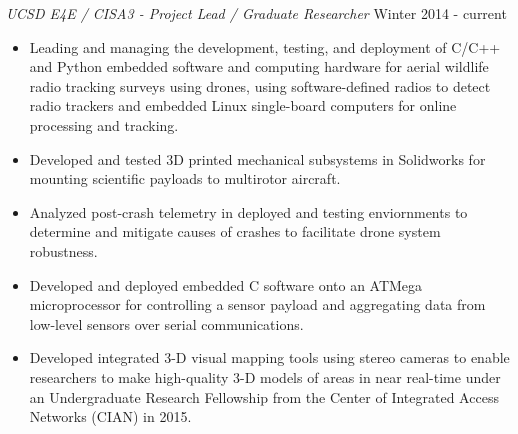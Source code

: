 \documentclass[line,margin]{res}
\begin{document}
\begin{resume}
	{\sl UCSD E4E / CISA3 - Project Lead / Graduate Researcher} \hfill Winter 2014 - current
	\begin{itemize}
		\item Leading and managing the development, testing, and deployment of C/C++ and Python embedded software and computing hardware for aerial wildlife radio tracking surveys using drones, using software-defined radios to detect radio trackers and embedded Linux single-board computers for online processing and tracking.
		\item Developed and tested 3D printed mechanical subsystems in Solidworks for mounting scientific payloads to multirotor aircraft.
		\item Analyzed post-crash telemetry in deployed and testing enviornments to determine and mitigate causes of crashes to facilitate drone system robustness.
		\item Developed and deployed embedded C software onto an ATMega microprocessor for controlling a sensor payload and aggregating data from low-level sensors over serial communications.
		\item Developed integrated 3-D visual mapping tools using stereo cameras to enable researchers to make high-quality 3-D models of areas in near real-time under an Undergraduate Research Fellowship from the Center of Integrated Access Networks (CIAN) in 2015.
	\end{itemize}


\end{resume}
\end{document}
